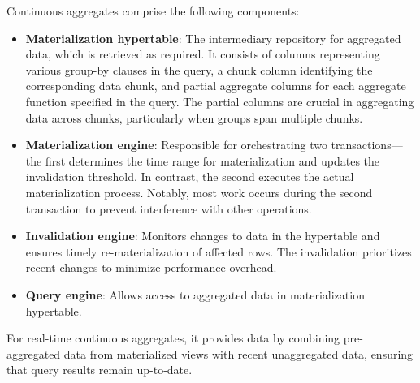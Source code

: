 
Continuous aggregates comprise the following components:

\begin{itemize}
    \item \textbf{Materialization hypertable}: The intermediary repository for aggregated data, which is retrieved as required. It consists of columns representing various group-by clauses in the query, a chunk column identifying the corresponding data chunk, and partial aggregate columns for each aggregate function specified in the query. The partial columns are crucial in aggregating data across chunks, particularly when groups span multiple chunks.

    \item \textbf{Materialization engine}: Responsible for orchestrating two transactions— the first determines the time range for materialization and updates the invalidation threshold. In contrast, the second executes the actual materialization process. Notably, most work occurs during the second transaction to prevent interference with other operations.

    \item \textbf{Invalidation engine}: Monitors changes to data in the hypertable and ensures timely re-materialization of affected rows. The invalidation prioritizes recent changes to minimize performance overhead.

    \item \textbf{Query engine}: Allows access to aggregated data in materialization hypertable.
\end{itemize}

For real-time continuous aggregates, it provides data by combining pre-aggregated data from materialized views with recent unaggregated data, ensuring that query results remain up-to-date.




